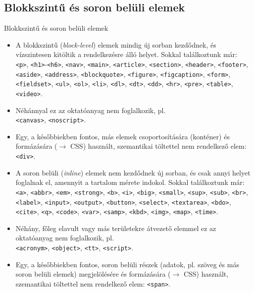 \subsection{Blokkszintű és soron belüli elemek}

\begin{frame}
  Blokkszintű és soron belüli elemek
  \begin{itemize}
    \item A blokkszintű (\emph{block-level}) elemek mindig új sorban kezdődnek, és vízszintesen kitöltik a rendelkezésre álló helyet. Sokkal találkoztunk már:\\
    \tiny \texttt{<p>}, \texttt{<h1>}-\texttt{<h6>}, \texttt{<nav>}, \texttt{<main>}, \texttt{<article>}, \texttt{<section>}, \texttt{<header>}, \texttt{<footer>}, \texttt{<aside>}, \texttt{<address>}, \texttt{<blockquote>}, \texttt{<figure>}, \texttt{<figcaption>}, \texttt{<form>}, \texttt{<fieldset>}, \texttt{<ul>}, \texttt{<ol>}, \texttt{<li>}, \texttt{<dl>}, \texttt{<dt>}, \texttt{<dd>}, \texttt{<hr>}, \texttt{<pre>}, \texttt{<table>}, \texttt{<video>}. \normalsize 
    \item Néhánnyal ez az oktatóanyag nem foglalkozik, pl.\\ \tiny \texttt{<canvas>}, \texttt{<noscript>}. \normalsize 
    \item Egy, a későbbiekben fontos, más elemek csoportosítására (konténer) és formázására ($\to$ CSS) használt, szemantikai töltettel nem rendelkező elem: \texttt{<div>}.
  \end{itemize}
\end{frame}

\begin{frame}
  \begin{itemize}
    \item A soron belüli (\emph{inline}) elemek nem kezdődnek új sorban, és csak annyi helyet foglalnak el, amennyit a tartalom mérete indokol. Sokkal találkoztunk már:\\ 
    \tiny \texttt{<a>}, \texttt{<abbr>}, \texttt{<em>}, \texttt{<strong>}, \texttt{<b>}, \texttt{<i>}, \texttt{<big>}, \texttt{<small>}, \texttt{<sup>}, \texttt{<sub>}, \texttt{<br>}, \texttt{<label>}, \texttt{<input>}, \texttt{<output>}, \texttt{<button>}, \texttt{<select>}, \texttt{<textarea>}, \texttt{<bdo>}, \texttt{<cite>}, \texttt{<q>}, \texttt{<code>}, \texttt{<var>}, \texttt{<samp>}, \texttt{<kbd>}, \texttt{<img>}, \texttt{<map>}, \texttt{<time>}. \normalsize
    \item Néhány, főleg elavult vagy más területekre átvezető elemmel ez az oktatóanyag nem foglalkozik, pl.\\ \tiny \texttt{<acronym>}, \texttt{<object>}, \texttt{<tt>}, \texttt{<script>}. \normalsize
    \item Egy, a későbbiekben fontos, soron belüli részek (adatok, pl. szöveg és más soron belüli elemek) megjelölésére és formázására ($\to$ CSS) használt, szemantikai töltettel nem rendelkező elem: \texttt{<span>}.
  \end{itemize}
\end{frame}

